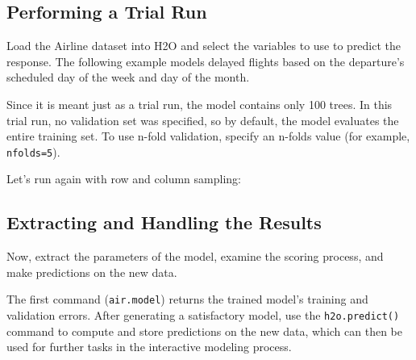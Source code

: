 \waterExampleInPython



\subsection{Performing a Trial Run}
Load the Airline dataset into H2O and select the variables to use to predict  the response. The following example models delayed flights based on the departure's scheduled day of the week and day of the month.

\waterExampleInR



\waterExampleInPython



Since it is meant just as a trial run, the model contains only 100 trees. In this trial run, no validation set was
specified, so by default, the model evaluates the entire training set.  To use n-fold validation, specify an n-folds value (for example, \texttt{nfolds=5}).

Let's run again with row and column sampling:

\waterExampleInR



\waterExampleInPython


\subsection{Extracting and Handling the Results}

Now, extract the parameters of the model, examine the scoring process, and make predictions on the new data.

\begin{minipage}{\textwidth}

\waterExampleInR

\end{minipage}

\begin{minipage}{\textwidth}
\waterExampleInPython

\end{minipage}

The first command ({\texttt{air.model}}) returns the trained model's training and validation errors.
After generating a satisfactory model, use the \texttt{h2o.predict()} command to compute and store predictions on the
new data, which can then be used for further tasks in the interactive modeling process.

